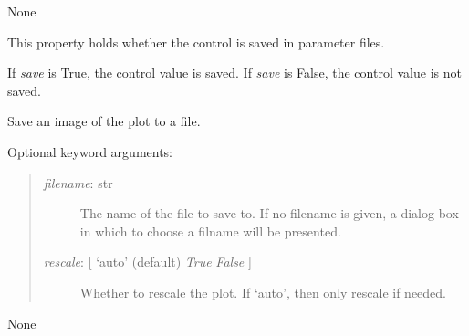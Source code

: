 \documentclass[letterpaper,10pt,english]{sphinxmanual}
\begin{document}
\begin{fulllineitems}
\begin{fulllineitems}
\end{fulllineitems}


\begin{fulllineitems}
\label{api:mpl.Chart2D.resize_action}
None

\end{fulllineitems}


\begin{fulllineitems}
\label{api:mpl.Chart2D.save}
This property holds whether the control is saved in parameter files.

If \emph{save} is True, the control value is saved.
If \emph{save} is False, the control value is not saved.

\end{fulllineitems}


\begin{fulllineitems}
\label{api:mpl.Chart2D.save_figure}
Save an image of the plot to a file.

Optional keyword arguments:
\begin{quote}
\begin{description}
\item[{\emph{filename}: str}] \leavevmode
The name of the file to save to. If no filename is given, a dialog
box in which to choose a filname will be presented.

\item[{\emph{rescale}: {[} `auto' (default) \textbar{} \emph{True} \textbar{} \emph{False} {]}}] \leavevmode
Whether to rescale the plot. If `auto', then only rescale if needed.

\end{description}
\end{quote}

\end{fulllineitems}


\begin{fulllineitems}
\label{api:mpl.Chart2D.scroll_action}
None

\end{fulllineitems}


\end{fulllineitems}
\end{document}

